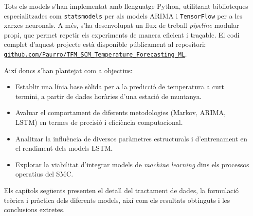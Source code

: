 \documentclass[../main.tex]{subfiles}
\begin{document}
Tots els models s’han implementat amb llenguatge Python, utilitzant biblioteques especialitzades com \texttt{statsmodels} per als models ARIMA i \texttt{TensorFlow} per a les xarxes neuronals. A més, s’ha desenvolupat un flux de treball \textit{pipeline} modular propi, que permet repetir els experiments de manera eficient i traçable. El codi complet d’aquest projecte està disponible públicament al repositori: \href{https://github.com/Paurro/TFM_SCM_Temperature_Forecasting_ML}{\texttt{github.com/Paurro/TFM\_SCM\_Temperature\_Forecasting\_ML}}.

Així doncs s'han plantejat com a objectius:

\begin{itemize}
    \item Establir una línia base sòlida per a la predicció de temperatura a curt termini, a partir de dades horàries d’una estació de muntanya.

    \item Avaluar el comportament de diferents metodologies (Markov, ARIMA, LSTM) en termes de precisió i eficiència computacional.

    \item Analitzar la influència de diversos paràmetres estructurals i d’entrenament en el rendiment dels models LSTM.

    \item Explorar la viabilitat d’integrar models de \textit{machine learning} dins els processos operatius del SMC.
\end{itemize}

Els capítols següents presenten el detall del tractament de dades, la formulació teòrica i pràctica dels diferents models, així com els resultats obtinguts i les conclusions extretes.

\end{document}
